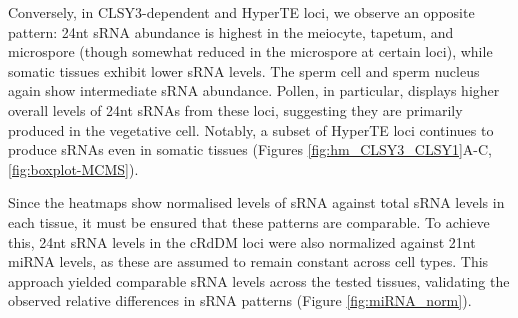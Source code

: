 Conversely, in CLSY3-dependent and HyperTE loci, we observe an opposite pattern: 24nt sRNA abundance is highest in the meiocyte, tapetum, and microspore (though somewhat reduced in the microspore at certain loci), while somatic tissues exhibit lower sRNA levels. The sperm cell and sperm nucleus again show intermediate sRNA abundance. Pollen, in particular, displays higher overall levels of 24nt sRNAs from these loci, suggesting they are primarily produced in the vegetative cell. Notably, a subset of HyperTE loci continues to produce sRNAs even in somatic tissues (Figures \ref{fig:hm_CLSY3_CLSY1}A-C, \ref{fig:boxplot-MCMS}).

Since the heatmaps show normalised levels of sRNA against total sRNA levels in each tissue, it must be ensured that these patterns are comparable. To achieve this, 24nt sRNA levels in the cRdDM loci were also normalized against 21nt miRNA levels, as these are assumed to remain constant across cell types. This approach yielded comparable sRNA levels across the tested tissues, validating the observed relative differences in sRNA patterns (Figure \ref{fig:miRNA_norm}).

